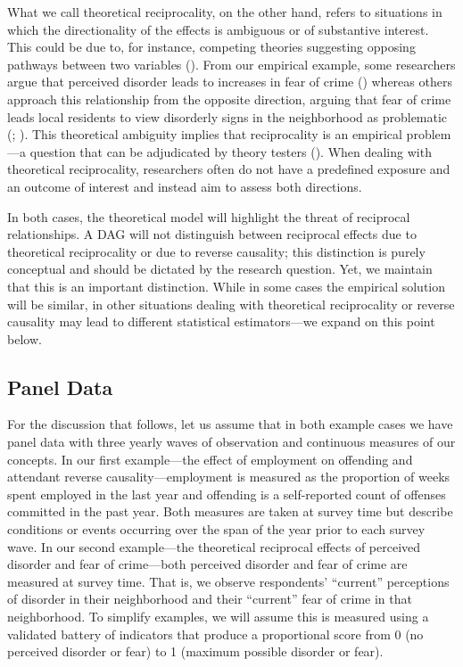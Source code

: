 \documentclass[
  letterpaper,
  DIV=11,
  numbers=noendperiod]{scrartcl}
\begin{document}
What we call theoretical reciprocality, on the other hand, refers to
situations in which the directionality of the effects is ambiguous or of
substantive interest. This could be due to, for instance, competing
theories suggesting opposing pathways between two variables
(). From our
empirical example, some researchers argue that perceived disorder leads
to increases in fear of crime () whereas others approach this relationship from the
opposite direction, arguing that fear of crime leads local residents to
view disorderly signs in the neighborhood as problematic
(;
). This theoretical
ambiguity implies that reciprocality is an empirical problem---a
question that can be adjudicated by theory testers
(). When dealing
with theoretical reciprocality, researchers often do not have a
predefined exposure and an outcome of interest and instead aim to assess
both directions.

In both cases, the theoretical model will highlight the threat of
reciprocal relationships. A DAG will not distinguish between reciprocal
effects due to theoretical reciprocality or due to reverse causality;
this distinction is purely conceptual and should be dictated by the
research question. Yet, we maintain that this is an important
distinction. While in some cases the empirical solution will be similar,
in other situations dealing with theoretical reciprocality or reverse
causality may lead to different statistical estimators---we expand on
this point below.

\subsection{Panel Data}\label{panel-data}

For the discussion that follows, let us assume that in both example
cases we have panel data with three yearly waves of observation and
continuous measures of our concepts. In our first example---the effect
of employment on offending and attendant reverse causality---employment
is measured as the proportion of weeks spent employed in the last year
and offending is a self-reported count of offenses committed in the past
year. Both measures are taken at survey time but describe conditions or
events occurring over the span of the year prior to each survey wave. In
our second example---the theoretical reciprocal effects of perceived
disorder and fear of crime---both perceived disorder and fear of crime
are measured at survey time. That is, we observe respondents'
``current'' perceptions of disorder in their neighborhood and their
``current'' fear of crime in that neighborhood. To simplify examples, we
will assume this is measured using a validated battery of indicators
that produce a proportional score from 0 (no perceived disorder or fear)
to 1 (maximum possible disorder or fear).
\end{document}
